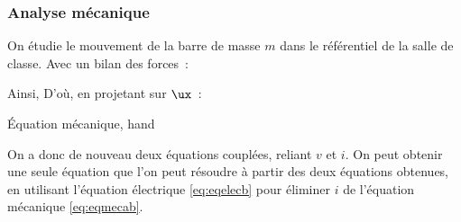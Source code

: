 \documentclass[../main/main.tex]{subfiles}
\begin{document}
\subsubsection{Analyse mécanique}
\label{sssec:rlplgene_anameca}
On étudie le mouvement de la barre de masse $m$ dans le référentiel de la
salle de classe. Avec un bilan des forces~:
\begin{itemize}[label=$\diamond$, leftmargin=10pt]
	 
	 
	 
	 
	 
\end{itemize}
Ainsi,
D'où, en projetant sur $\ux$~:
\begin{tprop}{Équation mécanique, hand}
\end{tprop}

On a donc de nouveau deux équations couplées, reliant $v$ et $i$. On peut
obtenir une seule équation que l'on peut résoudre à partir des deux équations
obtenues, en utilisant l'équation électrique \eqref{eq:eqelecb} pour éliminer
$i$ de l'équation mécanique \eqref{eq:eqmecab}.
\end{document}
